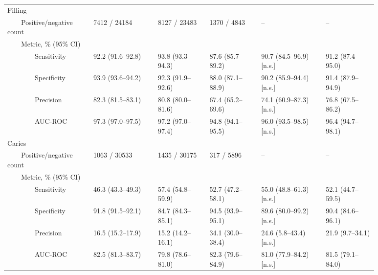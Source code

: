 \begin{table}[!h]
\begin{tabular}{ p{0.2\linewidth}p{0.15\linewidth}p{0.125\linewidth}p{0.125\linewidth}|p{0.15\linewidth}p{0.125\linewidth} }
Filling &   &   &   &   &   \\
{~~~~}Positive/negative count & \num{7412} / \num{24184} & \num{8127} / \num{23483} & \num{1370} / \num{4843} & -- & -- \\
{~~~~}Metric, \% (95\% CI) &   &   &   &   &   \\
{~~~~~~~~}Sensitivity & 92.2 {(91.6--92.8)} & 93.8 {(93.3--94.3)} & 87.6 {(85.7--89.2)} & 90.7 (84.5--96.9) [n.s.] & 91.2 (87.4--95.0) \\
{~~~~~~~~}Specificity & 93.9 {(93.6--94.2)} & 92.3 {(91.9--92.6)} & 88.0 {(87.1--88.9)} & 90.2 (85.9--94.4) [n.s.] & 91.4 (87.9--94.9) \\
{~~~~~~~~}Precision & 82.3 {(81.5--83.1)} & 80.8 {(80.0--81.6)} & 67.4 {(65.2--69.6)} & 74.1 (60.9--87.3) [n.s.] & 76.8 (67.5--86.2) \\
{~~~~~~~~}AUC-ROC & 97.3 {(97.0--97.5)} & 97.2 {(97.0--97.4)} & 94.8 {(94.1--95.5)} & 96.0 (93.5--98.5) [n.s.] & 96.4 (94.7--98.1) \\ \midrule

Caries &   &   &   &   &   \\
{~~~~}Positive/negative count & \num{1063} / \num{30533} & \num{1435} / \num{30175} & \num{317} / \num{5896} & -- & -- \\
{~~~~}Metric, \% (95\% CI) &   &   &   &   &   \\
{~~~~~~~~}Sensitivity & 46.3 {(43.3--49.3)} & 57.4 {(54.8--59.9)} & 52.7 {(47.2--58.1)} & 55.0 (48.8--61.3) [n.s.] & 52.1 (44.7--59.5) \\
{~~~~~~~~}Specificity & 91.8 {(91.5--92.1)} & 84.7 {(84.3--85.1)} & 94.5 {(93.9--95.1)} & 89.6 (80.0--99.2) [n.s.] & 90.4 (84.6--96.1) \\
{~~~~~~~~}Precision & 16.5 {(15.2--17.9)} & 15.2 {(14.2--16.1)} & 34.1 {(30.0--38.4)} & 24.6 (5.8--43.4) [n.s.] & 21.9 (9.7--34.1) \\
{~~~~~~~~}AUC-ROC & 82.5 {(81.3--83.7)} & 79.8 {(78.6--81.0)} & 82.3 {(79.6--84.9)} & 81.0 (77.9--84.2) [n.s.] & 81.5 (79.1--84.0) \\ \midrule


\end{tabular}
\end{table}

